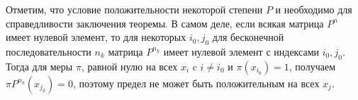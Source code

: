 \begin{note}
    Отметим, что условие положительности некоторой степени $P$ и необходимо для справедливости заключения теоремы. В самом деле, если всякая матрица $P^n$ имеет нулевой элемент, то для некоторых $i_0, j_0$ для бесконечной последовательности $n_k$ матрица $P^{n_k}$ имеет нулевой элемент с индексами $i_0, j_0$. Тогда для меры $\pi$, равной нулю на всех $x_i$ c $i \neq i_0$ и $\pi(x_{i_0}) = 1$, получаем $\pi P^{n_k} (x_{j_0}) = 0$, поэтому предел не может быть положительным на всех $x_j$.
\end{note}